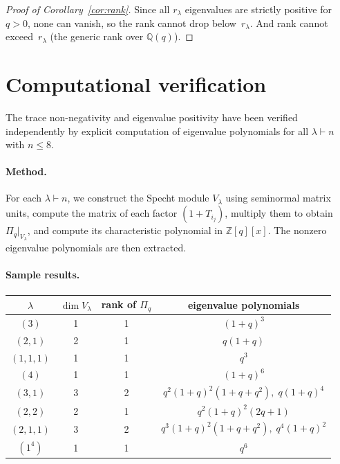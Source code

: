 \documentclass[11pt]{article}
\theoremstyle{definition}
\theoremstyle{remark}
\begin{document}
\begin{proof}[Proof of Corollary~\ref{cor:rank}]
Since all $r_\lambda$ eigenvalues are strictly positive for $q > 0$,
none can vanish, so the rank cannot drop below~$r_\lambda$.
And rank cannot exceed~$r_\lambda$ (the generic rank over $\mathbb{Q}(q)$).
\end{proof}

\section{Computational verification}\label{sec:comp}

The trace non-negativity and eigenvalue positivity have been verified
independently by explicit computation of eigenvalue polynomials for
all $\lambda \vdash n$ with $n \leq 8$.

\paragraph{Method.}
For each $\lambda \vdash n$, we construct the Specht module $V_\lambda$
using seminormal matrix units, compute the matrix of each factor
$(1 + T_{i_j})$, multiply them to obtain $\Pi_q|_{V_\lambda}$,
and compute its characteristic polynomial in $\mathbb{Z}[q][x]$.
The nonzero eigenvalue polynomials are then extracted.

\paragraph{Sample results.}
\begin{center}
\begin{tabular}{cccc}
\hline
$\lambda$ & $\dim V_\lambda$ & rank of $\Pi_q$ & eigenvalue polynomials \\
\hline
$(3)$ & 1 & 1 & $(1+q)^3$ \\
$(2,1)$ & 2 & 1 & $q(1+q)$ \\
$(1,1,1)$ & 1 & 1 & $q^3$ \\
$(4)$ & 1 & 1 & $(1+q)^6$ \\
$(3,1)$ & 3 & 2 & $q^2(1+q)^2(1+q+q^2),\; q(1+q)^4$ \\
$(2,2)$ & 2 & 1 & $q^2(1+q)^2(2q+1)$ \\
$(2,1,1)$ & 3 & 2 & $q^3(1+q)^2(1+q+q^2),\; q^4(1+q)^2$ \\
$(1^4)$ & 1 & 1 & $q^6$ \\
\hline
\end{tabular}
\end{center}
\end{document}
